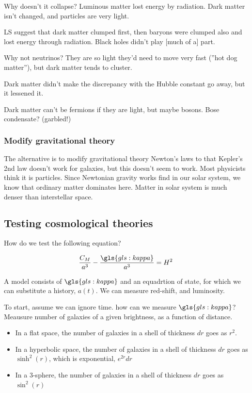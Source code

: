 \documentclass[]{article}
\begin{document}
Why doesn't it collapse? Luminous matter lost energy by radiation. Dark matter isn't changed, and particles are very light.

LS suggest that dark matter clumped first, then baryons were clumped also and lost energy through radiation. Black holes didn't play [much of a] part.

Why not neutrinos? They are so light they'd need to move very fast (''hot dog matter''), but dark matter tends to cluster.

Dark matter didn't make the discrepancy with the Hubble constant go away, but it lessened it.

Dark matter can't be fermions  if they are light, but maybe bosons. Bose condensate? (garbled!)

\subsubsection{Modify gravitational theory}

The alternative is to modify gravitational theory Newton's laws to that  Kepler's 2nd law doesn't work for galaxies, but this doesn't seem to work.
Most physicists think it is particles. Since Newtonian gravity works find in our solar system, we know that ordinary matter dominates here. Matter in solar system is much denser than interstellar space.

\subsection{Testing cosmological theories}

How do we test the following equation?

\begin{align*}
	\frac{C_M}{a^3} - \frac{\gls{gls:kappa}}{a^3} = H^2
\end{align*}

A model consists of $\gls{gls:kappa}$ and an equadrtion of state, for which we can substitute a history, $a(t)$. We can measure red-shift, and luminosity.

To start, assume we can ignore time. how can we measure $\gls{gls:kappa}$? Meausure number of galaxies of a given brightness, as a function of distance.

\begin{itemize}
	\item In a flat space, the number of galaxies in a shell of thickness $dr$ goes as $r^2$.
	\item In a hyperbolic space, the number of galaxies in a shell of thickness $dr$ goes as $\sinh^2(r)$, which is exponential, $e^{2r}dr$
	\item In a 3-sphere, the number of galaxies in a shell of thickness $dr$ goes as $\sin^2(r)$
\end{itemize}
\end{document}
